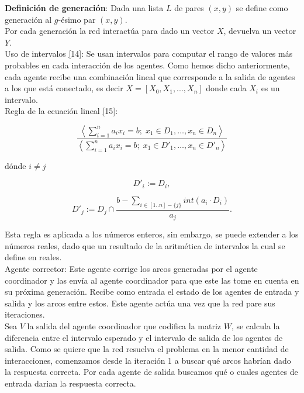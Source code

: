         \textbf{Definición de generación}: Dada una lista $L$ de pares $(x,y)$ se define como generación al $g$-ésimo par $(x,y)$. \\

        Por cada generación la red interactúa para dado un vector $X$, devuelva un vector $Y$.\\

        Uso de intervalos \hyperref[sec:24][14]: Se usan intervalos para computar el rango de valores más probables en cada interacción de los agentes. Como hemos dicho anteriormente, cada agente recibe una combinación lineal
        que corresponde a la salida de agentes a los que está conectado, es decir $X=[X_0,X_1,...,X_n]$ donde cada $X_i$ es un intervalo. \\

        Regla de la ecuación lineal \hyperref[sec:25][15]:

                $$\frac{\left\langle \sum_{i=1}^{n} a_i x_i = b ; \; x_1 \in D_1, \ldots, x_n \in D_n \right\rangle}
                {\left\langle \sum_{i=1}^{n} a_i x_i = b ; \; x_1 \in D'_1, \ldots, x_n \in D'_n \right\rangle}$$

            dónde $i \neq j$

            \[ D'_i := D_i, \]

            \[ D'_j := D_j \cap \frac{b - \sum_{i \in [1..n] - \{j\}} int(a_i \cdot D_i)}{a_j}. \]

            Esta regla es aplicada a los números enteros, sin embargo, se puede extender a los números reales, dado que un resultado de la aritmética de intervalos la cual se define en reales.\\

        Agente corrector: Este agente corrige los arcos generadas por el agente coordinador y las envía al agente coordinador para que este las tome en cuenta en su próxima generación. Recibe como entrada el estado de los agentes de entrada y salida y los arcos entre estos. Este agente actúa una vez que la red pare sus iteraciones. \\

        Sea $V$ la salida del agente coordinador que codifica la matriz $W$, se calcula la diferencia entre el intervalo esperado y el intervalo de salida de los agentes de salida.
        Como se quiere que la red resuelva el problema en la menor cantidad de interacciones, comenzamos desde la iteración 1 a buscar qué arcos habrían dado la
        respuesta correcta. Por cada agente de salida buscamos qué o cuales agentes de entrada darian la respuesta correcta.  \\

